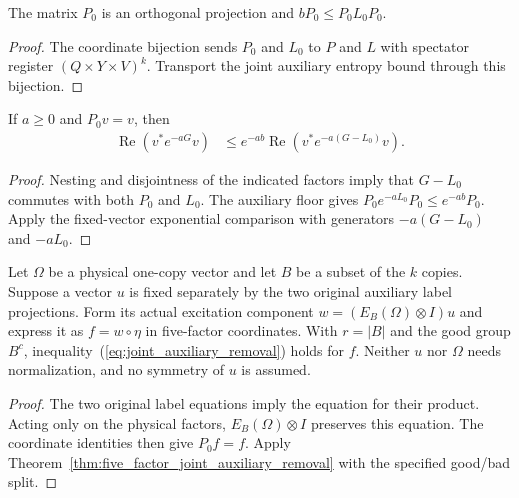 \begin{theorem}
  \label{thm:five_factor_joint_auxiliary_floor}
  \leanok
  The matrix $P_0$ is an orthogonal projection and $bP_0\leq P_0L_0P_0$.
\end{theorem}
\begin{proof}
  \leanok
  The coordinate bijection sends $P_0$ and $L_0$ to $P$ and $L$
  with spectator register $(Q\times Y\times V)^k$.
  Transport the joint auxiliary entropy bound through this bijection.
\end{proof}

\begin{theorem}
  \label{thm:five_factor_joint_auxiliary_removal}
  \leanok
  If $a\geq0$ and $P_0v=v$, then
  \begin{align}
    \operatorname{Re}(v^*e^{-aG}v)
    &\leq e^{-ab}\operatorname{Re}(v^*e^{-a(G-L_0)}v).
    \label{eq:joint_auxiliary_removal}
  \end{align}
\end{theorem}
\begin{proof}
  \leanok
  Nesting and disjointness of the indicated factors imply that $G-L_0$
  commutes with both $P_0$ and $L_0$. The auxiliary floor gives
  $P_0e^{-aL_0}P_0\leq e^{-ab}P_0$. Apply the fixed-vector exponential
  comparison with generators $-a(G-L_0)$ and $-aL_0$.
\end{proof}

\begin{theorem}
  \label{thm:excitation_joint_auxiliary_removal}
  \leanok
  Let $\Omega$ be a physical one-copy vector and let $B$ be a subset of
  the $k$ copies. Suppose a vector $u$ is fixed separately by the two
  original auxiliary label projections. Form its actual excitation
  component $w=(E_B(\Omega)\otimes I)u$ and express it as $f=w\circ\eta$
  in five-factor coordinates. With $r=|B|$ and the good group $B^c$,
  inequality~(\ref{eq:joint_auxiliary_removal}) holds for $f$.
  Neither $u$ nor $\Omega$ needs normalization, and no symmetry of $u$
  is assumed.
\end{theorem}
\begin{proof}
  \leanok
  The two original label equations imply the equation for their
  product. Acting only on the physical factors, $E_B(\Omega)\otimes I$
  preserves this equation. The coordinate identities then give
  $P_0f=f$. Apply Theorem~\ref{thm:five_factor_joint_auxiliary_removal}
  with the specified good/bad split.
\end{proof}
